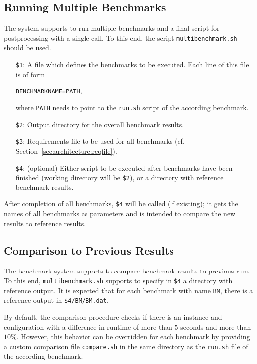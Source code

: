 \documentclass[a4paper]{article}
\begin{document}
		\subsection{Running Multiple Benchmarks}
		\label{sec:advanced:multiple}
					
			The system supports to run multiple benchmarks and a final script for postprocessing with a single call.
			To this end, the script {\tt multibenchmark.sh} should be used.

			\medskip{}
			\begin{itemize}
				\item[{\tt \$1}:] A file which defines the benchmarks to be executed.
					Each line of this file is of form
					\begin{center}
						{\tt BENCHMARKNAME=PATH},
					\end{center}
					where {\tt PATH} needs to point to the {\tt run.sh} script of the according benchmark.
				\item[{\tt \$2}:] Output directory for the overall benchmark results.
				\item[{\tt \$3}:] Requirements file to be used for all benchmarks (cf. Section~\ref{sec:architecture:reqfile}).
				\item[{\tt \$4}:] (optional) Either script to be executed after benchmarks have been finished (working directory will be {\tt \$2}),
				    or a directory with reference benchmark results.
			\end{itemize}
			
			After completion of all benchmarks, {\tt \$4} will be called (if existing); it gets the names of all benchmarks as parameters
			and is intended to compare the new results to reference results.
					
		\subsection{Comparison to Previous Results}
					
			The benchmark system supports to compare benchmark results
			to previous runs.
			To this end, {\tt multibenchmark.sh}
			supports to specify in {\tt \$4} a directory with reference output.
			It is expected that for each benchmark with name {\tt BM},
			there is a reference output in {\tt \$4/BM/BM.dat}.
			
			By default, the comparison procedure checks if there is an
			instance and configuration with a difference in runtime of more than $5$ seconds and more than $10\%$.
			However, this behavior can be overridden for each benchmark
			by providing a custom comparison file {\tt compare.sh}
			in the same directory as the {\tt run.sh} file of the according benchmark.
			
\end{document}
